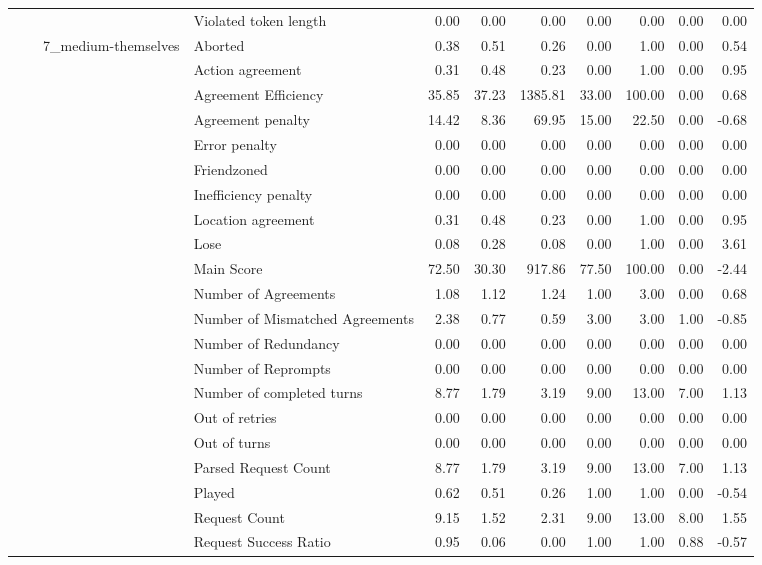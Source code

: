 \begin{tabular}{llllrrrrrrr}
 &  &  & Violated token length & 0.00 & 0.00 & 0.00 & 0.00 & 0.00 & 0.00 & 0.00 \\
\cline{3-11}
 &  & \multirow[t]{27}{*}{7_medium-themselves} & Aborted & 0.38 & 0.51 & 0.26 & 0.00 & 1.00 & 0.00 & 0.54 \\
 &  &  & Action agreement & 0.31 & 0.48 & 0.23 & 0.00 & 1.00 & 0.00 & 0.95 \\
 &  &  & Agreement Efficiency & 35.85 & 37.23 & 1385.81 & 33.00 & 100.00 & 0.00 & 0.68 \\
 &  &  & Agreement penalty & 14.42 & 8.36 & 69.95 & 15.00 & 22.50 & 0.00 & -0.68 \\
 &  &  & Error penalty & 0.00 & 0.00 & 0.00 & 0.00 & 0.00 & 0.00 & 0.00 \\
 &  &  & Friendzoned & 0.00 & 0.00 & 0.00 & 0.00 & 0.00 & 0.00 & 0.00 \\
 &  &  & Inefficiency penalty & 0.00 & 0.00 & 0.00 & 0.00 & 0.00 & 0.00 & 0.00 \\
 &  &  & Location agreement & 0.31 & 0.48 & 0.23 & 0.00 & 1.00 & 0.00 & 0.95 \\
 &  &  & Lose & 0.08 & 0.28 & 0.08 & 0.00 & 1.00 & 0.00 & 3.61 \\
 &  &  & Main Score & 72.50 & 30.30 & 917.86 & 77.50 & 100.00 & 0.00 & -2.44 \\
 &  &  & Number of Agreements & 1.08 & 1.12 & 1.24 & 1.00 & 3.00 & 0.00 & 0.68 \\
 &  &  & Number of Mismatched Agreements & 2.38 & 0.77 & 0.59 & 3.00 & 3.00 & 1.00 & -0.85 \\
 &  &  & Number of Redundancy & 0.00 & 0.00 & 0.00 & 0.00 & 0.00 & 0.00 & 0.00 \\
 &  &  & Number of Reprompts & 0.00 & 0.00 & 0.00 & 0.00 & 0.00 & 0.00 & 0.00 \\
 &  &  & Number of completed turns & 8.77 & 1.79 & 3.19 & 9.00 & 13.00 & 7.00 & 1.13 \\
 &  &  & Out of retries & 0.00 & 0.00 & 0.00 & 0.00 & 0.00 & 0.00 & 0.00 \\
 &  &  & Out of turns & 0.00 & 0.00 & 0.00 & 0.00 & 0.00 & 0.00 & 0.00 \\
 &  &  & Parsed Request Count & 8.77 & 1.79 & 3.19 & 9.00 & 13.00 & 7.00 & 1.13 \\
 &  &  & Played & 0.62 & 0.51 & 0.26 & 1.00 & 1.00 & 0.00 & -0.54 \\
 &  &  & Request Count & 9.15 & 1.52 & 2.31 & 9.00 & 13.00 & 8.00 & 1.55 \\
 &  &  & Request Success Ratio & 0.95 & 0.06 & 0.00 & 1.00 & 1.00 & 0.88 & -0.57 \\

\end{tabular}
